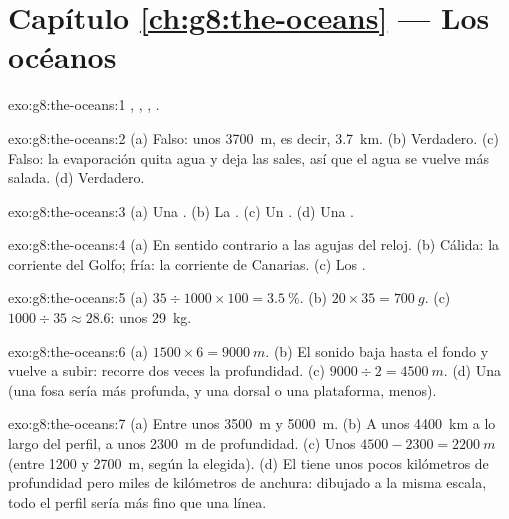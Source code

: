 \section*{Capítulo \ref{ch:g8:the-oceans} --- Los océanos}

\begin{solution}{exo:g8:the-oceans:1}
, , , .
\end{solution}

\begin{solution}{exo:g8:the-oceans:2}
(a) Falso: unos \qty{3700}{m}, es decir, \qty{3.7}{km}. (b) Verdadero.
(c) Falso: la evaporación quita agua y deja las sales, así que el agua se
vuelve más salada. (d) Verdadero.
\end{solution}

\begin{solution}{exo:g8:the-oceans:3}
(a) Una . (b) La . (c) Un . (d) Una .
\end{solution}

\begin{solution}{exo:g8:the-oceans:4}
(a) En sentido contrario a las agujas del reloj. (b) Cálida: la corriente
del Golfo; fría: la corriente de Canarias. (c) Los .
\end{solution}

\begin{solution}{exo:g8:the-oceans:5}
(a) $35 \div 1000 \times 100 = 3.5~\%$. (b) $20 \times 35 = \qty{700}{g}$.
(c) $1000 \div 35 \approx 28.6$: unos \qty{29}{kg}.
\end{solution}

\begin{solution}{exo:g8:the-oceans:6}
(a) $1500 \times 6 = \qty{9000}{m}$. (b) El sonido baja hasta el fondo y
vuelve a subir: recorre dos veces la profundidad. (c) $9000 \div 2 =
\qty{4500}{m}$. (d) Una  (una fosa sería más profunda, y una
dorsal o una plataforma, menos).
\end{solution}

\begin{solution}{exo:g8:the-oceans:7}
(a) Entre unos \qty{3500}{m} y \qty{5000}{m}. (b) A unos \qty{4400}{km} a
lo largo del perfil, a unos \qty{2300}{m} de profundidad. (c) Unos
$4500 - 2300 = \qty{2200}{m}$ (entre 1200 y \qty{2700}{m}, según la
 elegida). (d) El  tiene unos pocos kilómetros de profundidad
pero miles de kilómetros de anchura: dibujado a la misma escala, todo el
perfil sería más fino que una línea.
\end{solution}

